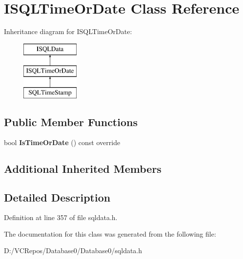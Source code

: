 \hypertarget{class_i_s_q_l_time_or_date}{}\section{I\+S\+Q\+L\+Time\+Or\+Date Class Reference}
\label{class_i_s_q_l_time_or_date}
Inheritance diagram for I\+S\+Q\+L\+Time\+Or\+Date\+:\begin{figure}[H]
\begin{center}
\leavevmode
\includegraphics[height=3.000000cm]{class_i_s_q_l_time_or_date}
\end{center}
\end{figure}
\subsection*{Public Member Functions}
\begin{DoxyCompactItemize}
\item 
\mbox{\label{class_i_s_q_l_time_or_date_a0da1ae5b76b33d65682d014f14072a69}} 
bool {\bfseries Is\+Time\+Or\+Date} () const override
\end{DoxyCompactItemize}
\subsection*{Additional Inherited Members}


\subsection{Detailed Description}


Definition at line 357 of file sqldata.\+h.



The documentation for this class was generated from the following file\+:\begin{DoxyCompactItemize}
\item 
D\+:/\+V\+C\+Repos/\+Database0/\+Database0/sqldata.\+h\end{DoxyCompactItemize}
